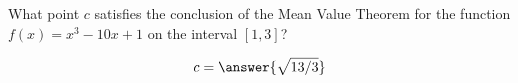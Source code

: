 \documentclass{ximera}
\author{Steven Gubkin}
\begin{document}
\begin{exercise}

What point $c$ satisfies the conclusion of the Mean Value Theorem for the function $f(x) = x^3-10x+1$ on the interval
$[1,3]$?

\begin{prompt}
	$$c = \answer{\sqrt{13/3}}$$
\end{prompt}

\end{exercise}
\end{document}
